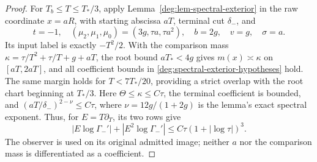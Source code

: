 \begin{proof}
For \(T_b\le T\le T_*/3\), apply
Lemma~\ref{deg:lem-spectral-exterior} in the raw coordinate \(x=aR\),
with starting abscissa \(aT\), terminal cut \(\delta_-\), and
\[
 t=-1,\quad (\mu_2,\mu_1,\mu_0)=(3g,\tau a,\tau a^2),\quad
 b=2g,\quad v=g,\quad \sigma=a.
\]
Its input label is exactly \(-T^2/2\). With the comparison mass
\(\kappa=\tau/T^2+\tau/T+g+aT\), the root bound \(aT_*<4g\)
gives \(m(x)\asymp\kappa\) on \([aT,2aT]\), and all coefficient
bounds in \eqref{deg:spectral-exterior-hypotheses} hold.
The same margin holds for \(T<7T_*/20\), providing a strict overlap
with the root chart beginning at \(T_*/3\).
Here \(\Theta\le\kappa\le C\tau\), the terminal coefficient is
bounded, and \((aT/\delta_-)^{2-\nu}\le C\tau\), where
\(\nu=12g/(1+2g)\) is the lemma's exact spectral exponent.
Thus, for \(E=T\partial_T\), its two rows give
\[
 |E\log\Gamma_-'|+|E^2\log\Gamma_-'|
                       \le C\tau(1+|\log\tau|)^3.
\]
The observer is used on its original admitted image; neither \(a\)
nor the comparison mass is differentiated as a coefficient.


\end{proof}
